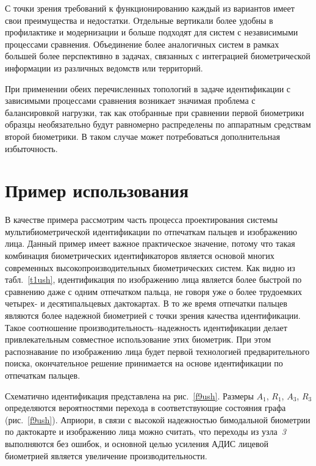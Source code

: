 \begin{multicols}{2}
     С точки зрения требований к функционированию каждый из вариантов имеет 
свои преимущества и недостатки. Отдельные вертикали более удобны в профилактике 
и модернизации и больше подходят для систем с независимыми процессами 
сравнения. Объединение более аналогичных сис\-тем в рамках большей более 
перспективно в задачах, связанных с интеграцией биометрической информации из 
различных ведомств или территорий. 
 {
 
 }    
     
     При применении обеих перечисленных топологий в задаче идентификации с 
зависимыми процессами сравнения возникает значимая проблема с балансировкой 
нагрузки, так как отобранные при сравнении первой биометрики образцы 
необязательно будут равномерно распределены по аппаратным средствам второй 
биометрики. В таком случае может потребоваться дополнительная избыточность. 


     
     \section{Пример использования}
     
     В качестве примера рассмотрим часть процесса проектирования системы 
мультибиометрической идентификации по отпечаткам пальцев и изображению лица. 
Данный пример имеет важное практическое значение, потому что такая комбинация 
биометрических идентификаторов является основой многих современных 
высокопроизводительных биометрических систем. Как видно из табл.~\ref{t1ush}, 
идентификация по изображению лица является более быстрой по сравнению даже с 
одним отпечатком %
 пальца, не говоря уже о более трудоемких четырех- и 
десятипальцевых дактокартах. В то же время отпечатки пальцев являются более 
надежной био\-мет\-ри\-ей с точки зрения качества идентификации. %
 Такое соотношение 
про\-из\-во\-ди\-тель\-ность--на\-деж\-ность идентификации делает привлекательным совместное 
использование этих биометрик. При этом распознавание по изображению лица будет 
первой технологией предварительного поиска, окончательное решение принимается на 
основе идентификации по отпечаткам пальцев. 
     
     Схематично идентификация представлена на рис.~\ref{f9ush}. Размеры $A_1$, 
$R_1$, $A_3$, $R_3$ определяются вероятностями перехода в соответствующие состояния 
графа (рис.~\ref{f9ush}). Априори, в связи с высокой надежностью бимодальной 
биометрии по дактокарте и изображению лица можно считать, что переходы из 
узла~\textit{3} выполняются без ошибок, и основной \mbox{целью} усиления АДИС лицевой 
биометрией является увеличение производительности.
     


\end{multicols}
